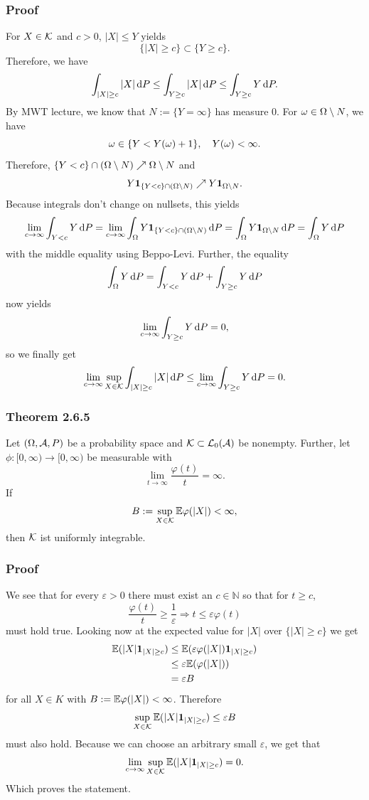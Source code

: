 \documentclass[12pt]{scrartcl}
\begin{document}
\subsubsection*{Proof}
\einruecken

For $X\in\mathcal{K}$ and $c>0$, $|X|\le Y$ yields
$$\{|X|\ge c\}\subset\{Y\ge c\}.$$
Therefore, we have
$$\int_{|X|\ge c}|X|\mathop{}\!\mathrm{d} P \le\int_{Y\ge c}|X|\mathop{}\!\mathrm{d} P \le\int_{Y\ge c}Y\mathop{}\!\mathrm{d} P.$$
By MWT lecture, we know that $N:=\{Y=\infty\}$ has measure $0$. For $\omega\in\Omega\setminus N$, we have 
$$\omega\in\{Y<Y(\omega)+1\},\quad Y(\omega)<\infty.$$
Therefore, $\{Y<c\}\cap(\Omega\setminus N)\nearrow\Omega\setminus N$ and
$$Y\textbf{1}_{\{Y<c\}\cap(\Omega\setminus N)}\nearrow Y\textbf{1}_{\Omega\setminus N}.$$
Because integrals don't change on nullsets, this yields
$$\lim_{c\rightarrow\infty}\int_{Y<c} Y\mathop{}\!\mathrm{d} P
= \lim_{c\rightarrow\infty}\int_{\Omega} Y\textbf{1}_{\{Y<c\}\cap(\Omega\setminus N)}\mathop{}\!\mathrm{d} P
= \int_{\Omega}Y\textbf{1}_{\Omega\setminus N}\mathop{}\!\mathrm{d} P
= \int_{\Omega}Y\mathop{}\!\mathrm{d} P$$
with the middle equality using Beppo-Levi. Further, the equality
$$\int_{\Omega}Y\mathop{}\!\mathrm{d} P =\int_{Y<c}Y\mathop{}\!\mathrm{d} P +\int_{Y\ge c}Y\mathop{}\!\mathrm{d} P$$
now yields
$$\lim_{c\rightarrow\infty}\int_{Y\ge c}Y\mathop{}\!\mathrm{d} P =0,$$
so we finally get
$$\lim_{c\rightarrow\infty}\sup_{X\in\mathcal{K}}\int_{|X|\ge c}|X|\mathop{}\!\mathrm{d} P
\le \lim_{c\rightarrow\infty}\int_{Y\ge c}Y\mathop{}\!\mathrm{d} P = 0.$$

\ausruecken

\subsubsection*{Theorem 2.6.5}

Let $(\Omega,\mathcal{A},P)$ be a probability space and $\mathcal{K}\subset\mathcal{L}_0(\mathcal{A})$ be nonempty. Further, let $\phi:[0,\infty)\rightarrow[0,\infty)$ be measurable with
$$\lim_{t\rightarrow\infty}\frac{\varphi(t)}{t}=\infty.$$
If
$$B:=\sup_{X\in\mathcal{K}}\mathbb{E}\varphi(|X|)<\infty,$$
then $\mathcal{K}$ ist uniformly integrable.

\subsubsection*{Proof}
\einruecken

We see that for every $\varepsilon > 0$ there must exist an $c \in \mathbb{N}$ so that for $t \geq c$,
$$\frac{\varphi(t)}{t} \geq \frac{1}{\varepsilon} \Rightarrow  t \leq \varepsilon \varphi(t) $$
must hold true. Looking now at the expected value for $\lvert X \rvert$ over $\{\lvert X \rvert \geq c \}$ we get 
\begin{align*}
	\mathbb{E}(\lvert X \rvert\textbf{1}_{\lvert X \rvert \geq c}) & \leq \mathbb{E}(\varepsilon \varphi(\lvert X \rvert) \textbf{1}_{\lvert X \rvert \geq c})  \\
	& \leq \varepsilon \mathbb{E}(\varphi(\lvert X \rvert)) \\
	& = \varepsilon B 
\end{align*}
for all $X \in K$ with $B:=\mathbb{E}\varphi(|X|)<\infty$. Therefore
$$ \sup_{X\in\mathcal{K}}\mathbb{E}(\lvert X \rvert\textbf{1}_{\lvert X \rvert \geq c}) \leq \varepsilon B $$
must also hold. Because we can choose an arbitrary small $\varepsilon$, we get that
$$\lim_{c \rightarrow \infty}\sup_{X\in\mathcal{K}}\mathbb{E}(\lvert X \rvert\textbf{1}_{\lvert X \rvert \geq c}) = 0.$$
Which proves the statement.
\ausruecken
\end{document}
